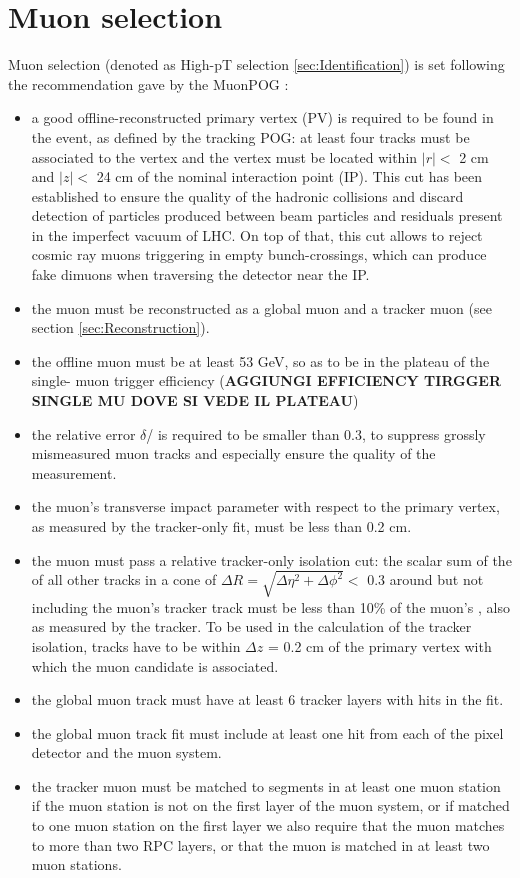 \section{Muon selection}
\label{sec:selection}
Muon selection (denoted as High-pT selection \ref{sec:Identification}) is set following the recommendation gave by the MuonPOG \cite{MuonPOG}:
\begin{itemize}
\item a good offline-reconstructed primary vertex (PV) is required to be found in the event, as defined by the tracking POG: at least four tracks must be associated to the vertex and the vertex must be located within $|r| <$ 2 cm and $|z|<$ 24 cm of the nominal interaction point (IP). This cut has been established to ensure the quality of the hadronic collisions and discard detection of particles produced between beam particles and residuals present in the imperfect vacuum of LHC. On top of that, this cut allows to reject cosmic ray muons triggering in empty bunch-crossings, which can produce fake dimuons when traversing the detector near the IP.
\item the muon must be reconstructed as a global muon and a tracker muon (see section \ref{sec:Reconstruction}).
\item the offline muon \pt must be at least 53 GeV, so as to be in the plateau of the single- muon trigger efficiency (\textbf{AGGIUNGI EFFICIENCY TIRGGER SINGLE MU DOVE SI VEDE IL PLATEAU})
\item the relative \pt error $\delta$\pt / \pt is required to be smaller than 0.3, to suppress grossly mismeasured muon tracks and especially ensure the quality of the \pt measurement.
\item the muon's transverse impact parameter with respect to the primary vertex, as measured by the tracker-only fit, must be less than 0.2 cm.
\item the muon must pass a relative tracker-only isolation cut: the scalar sum of the \pt of all other tracks in a cone of $\Delta R = \sqrt{\Delta\eta^2 + \Delta\phi^2} <$ 0.3 around but not including the muon's tracker track must be less than 10\% of the muon's \pt, also as measured by the tracker. To be used in the calculation of the tracker isolation, tracks have to be within $\Delta z$ = 0.2 cm of the primary vertex with which the muon candidate is associated.
\item the global muon track must have at least 6 tracker layers with hits in the fit.
\item the global muon track fit must include at least one hit from each of the pixel detector and the muon system.
\item the tracker muon must be matched to segments in at least one muon station if the muon station is not on the first layer of the muon system, or if matched to one muon station on the first layer we also require that the muon matches to more than two RPC layers, or that the muon is matched in at least two muon stations. 
\end{itemize}
